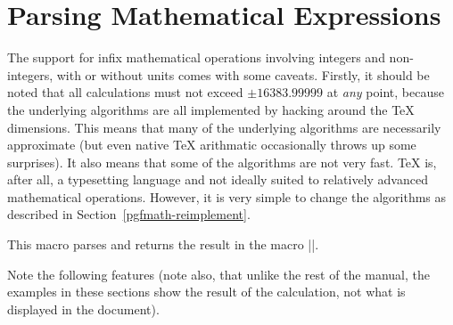 %
%
%
%

\section{Parsing Mathematical Expressions}

\label{pgfmath-parsing}

The support for infix mathematical operations involving 
integers and non-integers, with or without units comes with some 
caveats. Firstly, it should be noted that all
calculations must not exceed $\pm16383.99999$ at \emph{any} point, 
because the underlying algorithms are all implemented by hacking 
around the \TeX{} dimensions. This means that many of the underlying 
algorithms are necessarily approximate (but even native \TeX{} 
arithmatic occasionally throws up some surprises). It also means that
some of the algorithms are not very fast. \TeX{} is, after all, a
typesetting language and not ideally suited to relatively advanced 
mathematical operations. However, it is very simple to change the
algorithms as described in Section~\ref{pgfmath-reimplement}.

\begingroup
\let\medskip\smallskip%

\begin{command}{\pgfmathparse{}}

	This macro parses  and returns the result in 
	the macro |\pgfmathresult|. 
	
\end{command}

Note the following features (note also, that unlike the rest of the 
manual, the examples in these sections show the result of the 
calculation, not what is displayed in the document).


